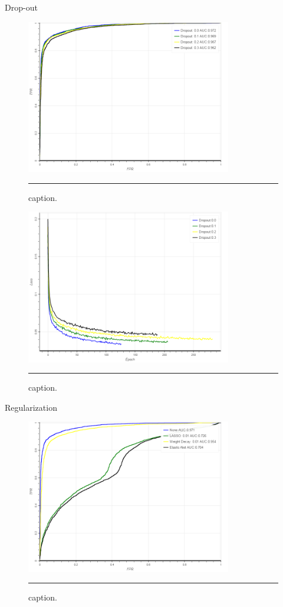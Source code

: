   Drop-out
  
\begin{figure}[htbp]
  \centering
    \includegraphics[width = 0.8\textwidth]{./Figures/AUC_dropout_mdl0.png}
    \rule{35em}{0.5pt}
  \caption[Dropout Performance]{caption.}
  \label{fig:}
\end{figure}

\begin{figure}[htbp]
  \centering
    \includegraphics[width = 0.8\textwidth]{./Figures/training_dropout_mdl0.png}
    \rule{35em}{0.5pt}
  \caption[Dropout Training]{caption.}
  \label{fig:}
\end{figure}


  Regularization
  
\begin{figure}[htbp]
  \centering
    \includegraphics[width = 0.8\textwidth]{./Figures/AUC_regularization_mdl0.png}
    \rule{35em}{0.5pt}
  \caption[Regularization]{caption.}
  \label{fig:}
\end{figure}


